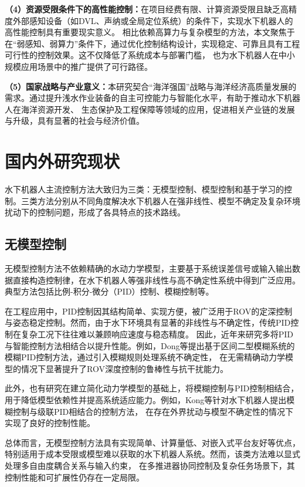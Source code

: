 \vspace{0.5em}
\noindent\textbf{（4）资源受限条件下的高性能控制：}在项目经费有限、计算资源受限且缺乏高精度外部感知设备（如DVL、声纳或全局定位系统）的条件下，实现水下机器人的高性能控制具有重要现实意义。
相比依赖高算力与复杂模型的方法，本文聚焦于在“弱感知、弱算力”条件下，通过优化控制结构设计，实现稳定、可靠且具有工程可行性的控制效果。这不仅降低了系统成本与部署门槛，
也为水下机器人在中小规模应用场景中的推广提供了可行路径。

\vspace{0.5em}
\noindent\textbf{（5）国家战略与产业意义：}本研究契合“海洋强国”战略与海洋经济高质量发展的需求。通过提升浅水作业装备的自主可控能力与智能化水平，有助于推动水下机器人在海洋资源开发、
生态保护及工程保障等领域的应用，促进相关产业链的发展与升级，具有显著的社会与经济价值。

\section{国内外研究现状}

水下机器人主流控制方法大致归为三类：无模型控制、模型控制和基于学习的控制。三类方法分别从不同角度解决水下机器人在强非线性、模型不确定及复杂环境扰动下的控制问题，形成了各具特点的技术路线。

\subsection{无模型控制}

无模型控制方法不依赖精确的水动力学模型，主要基于系统误差信号或输入输出数据直接构造控制律，在水下机器人等强非线性与高不确定性系统中得到广泛应用。典型方法包括比例-积分-微分（PID）控制、模糊控制等。

在工程应用中，PID控制因其结构简单、实现方便，被广泛用于ROV的定深控制与姿态稳定控制。然而，由于水下环境具有显著的非线性与不确定性，传统PID控制在复杂工况下往往难以兼顾响应速度与稳态精度。
因此，近年来研究多将PID与智能控制方法相结合以提升性能。例如，Dong等提出基于区间二型模糊系统的模糊PID控制方法，通过引入模糊规则处理系统不确定性，
在无需精确动力学模型的情况下显著提升了ROV深度控制的鲁棒性与抗干扰能力\cite{dong2023robust}。

此外，也有研究在建立简化动力学模型的基础上，将模糊控制与PID控制相结合，用于降低模型依赖性并提高系统适应能力。例如，Kong等针对水下机器人提出模糊控制与级联PID相结合的控制方法，
在存在外界扰动与模型不确定性的情况下实现了良好的控制性能\cite{kong2020dynamics}。

总体而言，无模型控制方法具有实现简单、计算量低、对嵌入式平台友好等优点，特别适用于成本受限或模型难以获取的水下机器人系统。然而，该类方法难以显式处理多自由度耦合关系与输入约束，
在多推进器协同控制及复杂任务场景下，其控制性能和可扩展性仍存在一定局限。

